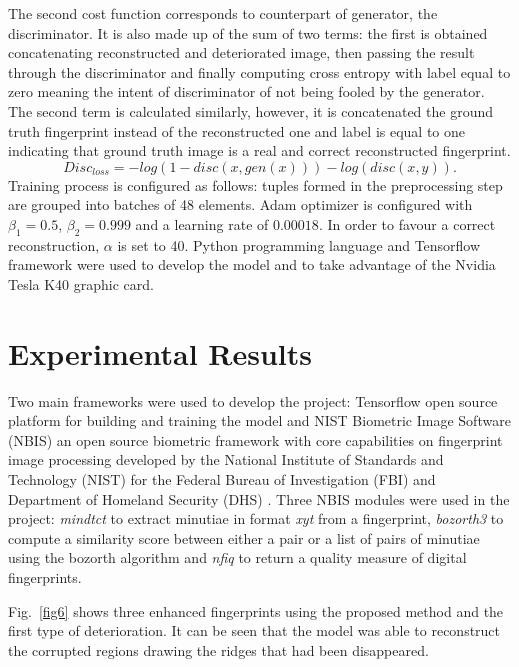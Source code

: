 \documentclass[a4paper,fleqn]{cas-dc}
\begin{document}
The second cost function corresponds to counterpart of generator, the discriminator. It is also made up of the sum of two terms: the first is obtained concatenating reconstructed and deteriorated image, then passing the result through the discriminator and finally computing cross entropy with label equal to zero meaning the intent of discriminator of not being fooled by the generator. The second term is calculated similarly, however, it is concatenated the ground truth fingerprint instead of the reconstructed one and label is equal to one indicating that ground truth image is a real and correct reconstructed fingerprint.
\begin{equation}
    Disc_{loss} = -log(1-disc(x,gen(x)))-log(disc(x,y)).
\end{equation}
Training process is configured as follows: tuples formed in the preprocessing step are grouped into batches of 48 elements. Adam optimizer is configured with $\beta_{1}=0.5$, $\beta_{2}=0.999$ and a learning rate of $0.00018$. In order to favour a correct reconstruction, $\alpha$ is set to 40. Python programming language  and Tensorflow framework were used to develop the model and to take advantage of the Nvidia Tesla K40 graphic card.



\section{Experimental Results}\label{sec:ER}
Two main frameworks were used to develop the project: Tensorflow open source platform for building and training the model and NIST Biometric Image Software (NBIS) an open source biometric framework with core capabilities on fingerprint image processing developed by the National Institute of Standards and Technology (NIST) for the Federal Bureau of Investigation (FBI) and Department of Homeland Security (DHS) \cite{NBISWP}. Three NBIS modules were used in the project: \textit{mindtct} to extract minutiae in format \textit{xyt} from a fingerprint, \textit{bozorth3} to compute a similarity score between either a pair or a list of pairs of minutiae using the bozorth algorithm and \textit{nfiq} to return a quality measure of digital fingerprints.



Fig.~\ref{fig6} shows three enhanced fingerprints using the proposed method and the first type of deterioration. It can be seen that the model was able to reconstruct the corrupted regions drawing the ridges that had been disappeared.
\end{document}
